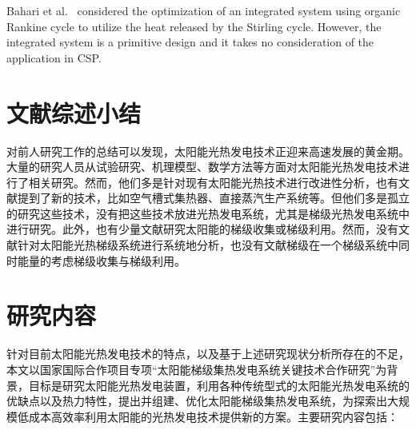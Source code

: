 Bahari et al.~\cite{Bahari2016} considered the optimization of an integrated system using organic Rankine cycle to utilize the heat released by the Stirling cycle. However, the integrated system is a primitive design and it takes no consideration of the application in CSP.


\section{文献综述小结}
对前人研究工作的总结可以发现，太阳能光热发电技术正迎来高速发展的黄金期。大量的研究人员从试验研究、机理模型、数学方法等方面对太阳能光热发电技术进行了相关研究。然而，他们多是针对现有太阳能光热技术进行改进性分析，也有文献提到了新的技术，比如空气槽式集热器、直接蒸汽生产系统等。但他们多是孤立的研究这些技术，没有把这些技术放进光热发电系统，尤其是梯级光热发电系统中进行研究。此外，也有少量文献研究太阳能的梯级收集或梯级利用。然而，没有文献针对太阳能光热梯级系统进行系统地分析，也没有文献梯级在一个梯级系统中同时能量的考虑梯级收集与梯级利用。

\section{研究内容}
\label{sec:researchContent}

针对目前太阳能光热发电技术的特点，以及基于上述研究现状分析所存在的不足，本文以国家国际合作项目专项“太阳能梯级集热发电系统关键技术合作研究”为背景，目标是研究太阳能光热发电装置，利用各种传统型式的太阳能光热发电系统的优缺点以及热力特性，提出并组建、优化太阳能梯级集热发电系统，为探索出大规模低成本高效率利用太阳能的光热发电技术提供新的方案。主要研究内容包括：

